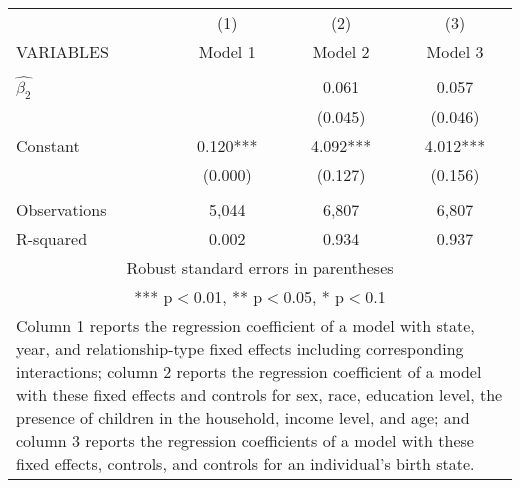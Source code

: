 \begin{tabular}{lccc}
\hline
 & (1) & (2) & (3) \\
VARIABLES & Model 1 & Model 2 & Model 3 \\ \hline
 &  &  &  \\
$\hat{\beta_2}$ &  & 0.061 & 0.057 \\
 &  & (0.045) & (0.046) \\
Constant & 0.120*** & 4.092*** & 4.012*** \\
 & (0.000) & (0.127) & (0.156) \\
 &  &  &  \\
Observations & 5,044 & 6,807 & 6,807 \\
 R-squared & 0.002 & 0.934 & 0.937 \\ \hline
\multicolumn{4}{c}{ Robust standard errors in parentheses} \\
\multicolumn{4}{c}{ *** p$<$0.01, ** p$<$0.05, * p$<$0.1} \\
\multicolumn{4}{p{0.6\linewidth}}{\footnotesize Column 1 reports the regression coefficient of a model with state, year, and relationship-type fixed effects including corresponding interactions; column 2 reports the regression coefficient of a model with these fixed effects and controls for sex, race, education level, the presence of children in the household, income level, and age; and column 3 reports the regression coefficients of a model with these fixed effects, controls, and controls for an individual’s birth state.} \\
\end{tabular}

